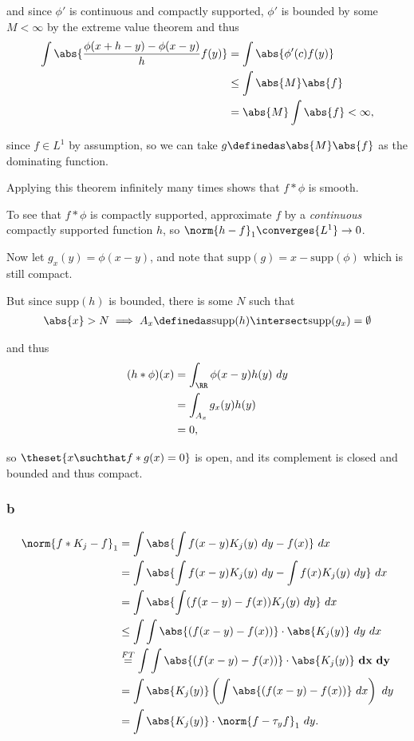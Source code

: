 \begin{solution}
and since \(\phi'\) is continuous and compactly supported, \(\phi'\) is
bounded by some \(M < \infty\) by the extreme value theorem and thus
\begin{align*}
\int \abs{\frac{\phi(x + h - y) - \phi(x - y)}{h} f(y)} 
&= \int \abs{\phi'(c) f(y)} \\
&\leq \int \abs{M}\abs{f} \\
&= \abs{M} \int \abs{f} < \infty
,\end{align*}

since \(f\in L^1\) by assumption, so we can take
\(g\definedas \abs{M} \abs{f}\) as the dominating function.

Applying this theorem infinitely many times shows that \(f\ast \phi\) is
smooth.

To see that \(f\ast \phi\) is compactly supported, approximate \(f\) by
a \emph{continuous} compactly supported function \(h\), so
\(\norm{h - f}_1 \converges{L^1}\to 0\).

Now let \(g_x(y) = \phi(x-y)\), and note that
\(\mathrm{supp}(g) = x - \mathrm{supp}(\phi)\) which is still compact.

But since \(\mathrm{supp}(h)\) is bounded, there is some \(N\) such that
\begin{align*}
\abs{x} > N \implies A_x\definedas \mathrm{supp}(h) \intersect \mathrm{supp}(g_x) = \emptyset
\end{align*}

and thus \begin{align*}
(h\ast \phi)(x) 
&= \int_\RR \phi(x-y) h(y)~dy \\
&= \int_{A_x} g_x(y) h(y) \\
&= 0
,\end{align*}

so \(\theset{x \suchthat f\ast g(x) = 0}\) is open, and its complement
is closed and bounded and thus compact.

\hypertarget{b-17}{%
\subsubsection{b}\label{b-17}}

\begin{align*}
\norm{f\ast K_j - f}_1 
&= \int \abs{\int f(x-y) K_j(y) ~dy  - f(x)}~dx \\
&= \int \abs{\int f(x-y) K_j(y) ~dy  - \int f(x) K_j(y) ~ dy}~dx \\
&= \int \abs{\int ( f(x-y) - f(x) ) K_j(y) ~dy } ~dx \\
&\leq \int \int \abs{(f(x-y) - f(x))} \cdot \abs{K_j(y)} ~ dy~dx \\
&\overset{FT}= \int \int \abs{(f(x-y) - f(x))} \cdot \abs{K_j(y)} \mathbf{~ dx~dy}\\
&= \int \abs{K_j(y)} \left( \int \abs{(f(x-y) - f(x))}  ~ dx\right) ~dy \\
&= \int \abs{K_j(y)} \cdot \norm{f - \tau_y f}_1 ~dy
.\end{align*}


\end{solution}
